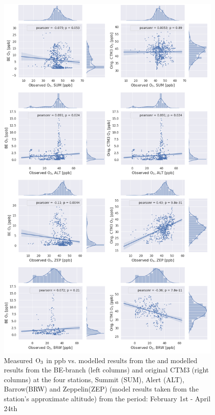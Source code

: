 \begin{figure}[ht]
    \centering
    \includegraphics[width = 0.8\linewidth]{Chapter6_Results/images/jointplot_FebApr_O3_2001.png}
    \caption{Measured $\mathrm{O_3}$ in ppb vs. modelled results from the and modelled results from the BE-branch (left columns) and original CTM3 (right columns) at the four stations, Summit (SUM), Alert (ALT), Barrow(BRW) and Zeppelin(ZEP) (model results taken from the station's approximate altitude) from the period: February 1st - April 24th}
    \label{fig:joint_FebApr}
\end{figure}